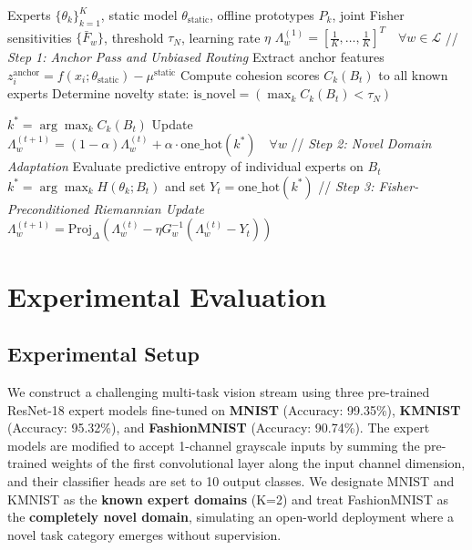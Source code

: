 \documentclass{article}
\theoremstyle{plain}
\theoremstyle{definition}
\theoremstyle{remark}
\begin{document}
\begin{algorithm}[tb]
\caption{IGGS-OW: Information-Geometric Gradient Surgery for Open-World TTMM}
\label{alg:iggs_ow}
\begin{algorithmic}[1]
 Experts $\{\theta_k\}_{k=1}^K$, static model $\theta_{\text{static}}$, offline prototypes $P_k$, joint Fisher sensitivities $\{\bar{F}_w\}$, threshold $\tau_N$, learning rate $\eta$
 $\Lambda_w^{(1)} = [\frac{1}{K}, \dots, \frac{1}{K}]^T \quad \forall w \in \mathcal{L}$
    \STATE // \textit{Step 1: Anchor Pass and Unbiased Routing}
    \STATE Extract anchor features $z^{\text{anchor}}_i = f(x_i; \theta_{\text{static}}) - \mu^{\text{static}}$
    \STATE Compute cohesion scores $C_k(B_t)$ to all known experts
    \STATE Determine novelty state: $\text{is\_novel} = \left(\max_k C_k(B_t) < \tau_N\right)$
    
        \STATE $k^* = \arg\max_k C_k(B_t)$
        \STATE Update $\Lambda_w^{(t+1)} = (1-\alpha)\Lambda_w^{(t)} + \alpha \cdot \text{one\_hot}(k^*) \quad \forall w$
    \ELSE
        \STATE // \textit{Step 2: Novel Domain Adaptation}
        \STATE Evaluate predictive entropy of individual experts on $B_t$
        \STATE $k^* = \arg\max_k H(\theta_k; B_t)$ and set $Y_t = \text{one\_hot}(k^*)$
        \STATE // \textit{Step 3: Fisher-Preconditioned Riemannian Update}
            \STATE $\Lambda_w^{(t+1)} = \text{Proj}_{\Delta} \left( \Lambda_w^{(t)} - \eta G_w^{-1} \left( \Lambda_w^{(t)} - Y_t \right) \right)$
        \ENDFOR
    \ENDIF
\ENDFOR
\end{algorithmic}
\end{algorithm}

\section{Experimental Evaluation}
\label{sec:experiments}

\subsection{Experimental Setup}
We construct a challenging multi-task vision stream using three pre-trained ResNet-18 expert models fine-tuned on \textbf{MNIST} (Accuracy: 99.35\%), \textbf{KMNIST} (Accuracy: 95.32\%), and \textbf{FashionMNIST} (Accuracy: 90.74\%). The expert models are modified to accept 1-channel grayscale inputs by summing the pre-trained weights of the first convolutional layer along the input channel dimension, and their classifier heads are set to 10 output classes. We designate MNIST and KMNIST as the \textbf{known expert domains} (K=2) and treat FashionMNIST as the \textbf{completely novel domain}, simulating an open-world deployment where a novel task category emerges without supervision.
\end{document}
